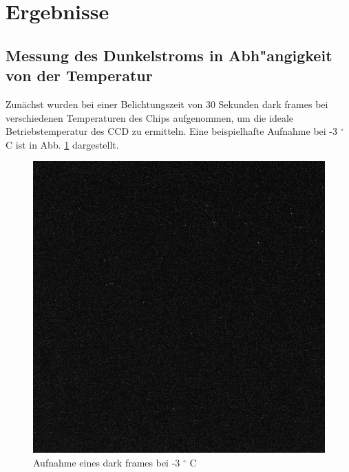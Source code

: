 \section{Ergebnisse}
\subsection{Messung des Dunkelstroms in Abh"angigkeit von der Temperatur}
Zunächst wurden bei einer Belichtungszeit von 30 Sekunden dark frames bei verschiedenen Temperaturen des Chips aufgenommen, um die ideale Betriebstemperatur des CCD zu ermitteln. Eine beispielhafte Aufnahme bei -3 $^\circ$ \, C ist in Abb. \ref{fig:dark} dargestellt. 

\begin{figure}[h!]
\centering
        \includegraphics[width=.5\textwidth]{dark.png}
\caption{ Aufnahme eines dark frames bei -3  $^\circ$ C}
\label{fig:dark}
\end{figure}

